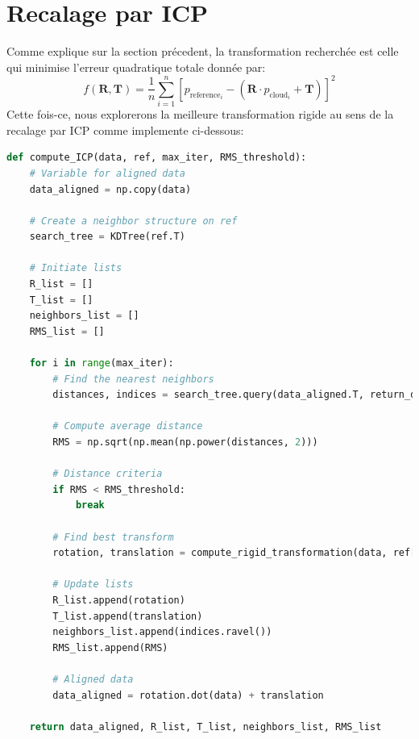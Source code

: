 \documentclass[../5RO17_TP4.tex]{subfiles}
\begin{document}
\section{Recalage par ICP}
\noindent Comme explique sur la section précedent, la transformation recherchée est celle qui minimise l'erreur quadratique totale donnée par:
\begin{equation}
    f(\mathbf{R}, \mathbf{T}) = \frac{1}{n} \sum_{i=1}^{n} \left[ p_{\text{reference}_i} - (\mathbf{R} \cdot p_{\text{cloud}_i} + \mathbf{T}) \right]^{2}
\end{equation}
Cette fois-ce, nous explorerons la meilleure transformation rigide au sens de la recalage par ICP comme implemente ci-dessous:
\begin{scriptsize}\mycode
	\begin{lstlisting}[language=Python, caption=\texttt{compute\_ICP()}]
def compute_ICP(data, ref, max_iter, RMS_threshold):
    # Variable for aligned data
    data_aligned = np.copy(data)

    # Create a neighbor structure on ref
    search_tree = KDTree(ref.T)

    # Initiate lists
    R_list = []
    T_list = []
    neighbors_list = []
    RMS_list = []

    for i in range(max_iter):
        # Find the nearest neighbors
        distances, indices = search_tree.query(data_aligned.T, return_distance=True)

        # Compute average distance
        RMS = np.sqrt(np.mean(np.power(distances, 2)))

        # Distance criteria
        if RMS < RMS_threshold:
            break

        # Find best transform
        rotation, translation = compute_rigid_transformation(data, ref[:, indices.ravel()])

        # Update lists
        R_list.append(rotation)
        T_list.append(translation)
        neighbors_list.append(indices.ravel())
        RMS_list.append(RMS)

        # Aligned data
        data_aligned = rotation.dot(data) + translation

    return data_aligned, R_list, T_list, neighbors_list, RMS_list
	\end{lstlisting}
\end{scriptsize}
\end{document}
